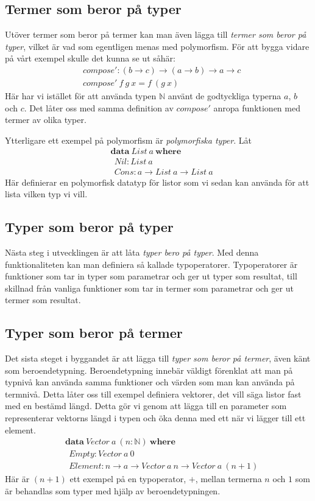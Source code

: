 \subsection{Termer som beror på typer}
Utöver termer som beror på termer kan man även lägga till \emph{termer som
beror på typer}, vilket är vad som egentligen menas med polymorfism. För att
bygga vidare på vårt exempel skulle det kunna se ut såhär:
\begin{align*}
  &compose' : (b \to c) \to (a \to b) \to a \to c \\
  &compose'\ f\ g\ x = f\ (g\ x)
\end{align*}
Här har vi istället för att använda typen $\mathbb{N}$ använt de godtyckliga
typerna $a$, $b$ och $c$. Det låter oss med samma definition av $compose'$
anropa funktionen med termer av olika typer.

Ytterligare ett exempel på polymorfism är \emph{polymorfiska typer}. Låt
\begin{align*}
  &\boldsymbol{data}\ List\ a\ \boldsymbol{where} \\
  &\ \ Nil : List\ a \\
  &\ \ Cons : a \to List\ a \to List\ a
\end{align*}
Här definierar en polymorfisk datatyp för listor som vi sedan kan använda för
att lista vilken typ vi vill.

\subsection{Typer som beror på typer}
Nästa steg i utvecklingen är att låta \emph{typer bero på typer}. Med denna
funktionaliteten kan man definiera så kallade typoperatorer. Typoperatorer är
funktioner som tar in typer som parametrar och ger ut typer som resultat, till
skillnad från vanliga funktioner som tar in termer som parametrar och ger ut
termer som resultat.

\subsection{Typer som beror på termer}
Det sista steget i byggandet är att lägga till \emph{typer som beror på
termer}, även känt som beroendetypning. Beroendetypning innebär väldigt
förenklat att man på typnivå kan använda samma funktioner och värden som man
kan använda på termnivå. Detta låter oss till exempel definiera vektorer, det
vill säga listor fast med en bestämd längd. Detta gör vi genom att lägga till
en parameter som representerar vektorns längd i typen och öka denna med ett när
vi lägger till ett element.
\begin{align*}
  &\boldsymbol{data}\ Vector\ a\ (n: \mathbb{N})\ \boldsymbol{where} \\
  &\ \ Empty : Vector\ a\ 0 \\
  &\ \ Element : n \to a \to Vector\ a\ n \to Vector\ a\ (n+1)
\end{align*}
Här är $(n+1)$ ett exempel på en typoperator, $+$, mellan termerna $n$ och $1$
som är behandlas som typer med hjälp av beroendetypningen.

